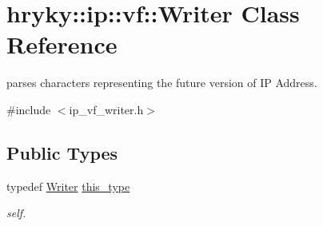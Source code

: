 \hypertarget{classhryky_1_1ip_1_1vf_1_1_writer}{\section{hryky\-:\-:ip\-:\-:vf\-:\-:Writer Class Reference}
\label{classhryky_1_1ip_1_1vf_1_1_writer}
}


parses characters representing the future version of I\-P Address.  




{\ttfamily \#include $<$ip\-\_\-vf\-\_\-writer.\-h$>$}

\subsection*{Public Types}
\begin{DoxyCompactItemize}
\item 
\hypertarget{classhryky_1_1ip_1_1vf_1_1_writer_aa50e41a90ce5f2371a4fecc1982da520}{typedef \hyperlink{classhryky_1_1ip_1_1vf_1_1_writer}{Writer} \hyperlink{classhryky_1_1ip_1_1vf_1_1_writer_aa50e41a90ce5f2371a4fecc1982da520}{this\-\_\-type}}\label{classhryky_1_1ip_1_1vf_1_1_writer_aa50e41a90ce5f2371a4fecc1982da520}

\begin{DoxyCompactList}\small\item\em self. \end{DoxyCompactList}\end{DoxyCompactItemize}
